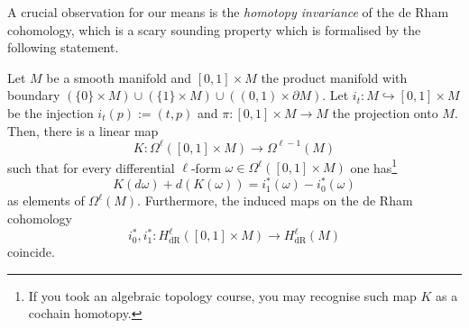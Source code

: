A crucial observation for our means is the \emph{homotopy invariance} of the de Rham cohomology, which is a scary sounding property which is formalised by the following statement.

\begin{theorem}\label{thm:deRham-invariance}
	Let $M$ be a smooth manifold and $[0,1]\times M$ the product manifold with boundary $(\{0\}\times M) \cup (\{1\}\times M) \cup ((0,1)\times\partial M)$.
	Let $i_t : M \hookrightarrow [0,1]\times M$ be the injection $i_t(p) := (t,p)$ and $\pi : [0,1]\times M \to M$ the projection onto $M$.
	Then, there is a linear map
	\begin{equation}
		K : \Omega^\ell([0,1]\times M)\to \Omega^{\ell-1}(M)
	\end{equation}
	such that for every differential $\ell$-form $\omega\in\Omega^\ell([0,1]\times M)$ one has\footnote{If you took an algebraic topology course, you may recognise such map $K$ as a cochain homotopy.}
	\begin{equation}
		K(d\omega) + d(K(\omega)) = i^*_1(\omega) - i^*_0(\omega)
	\end{equation}
	as elements of $\Omega^\ell(M)$.
	Furthermore, the induced maps on the de Rham cohomology
	\begin{equation}
		i_0^*, i_1^* : H_{\mathrm{dR}}^\ell([0,1]\times M) \to H_{\mathrm{dR}}^\ell(M)
	\end{equation}
	coincide.
\end{theorem}
